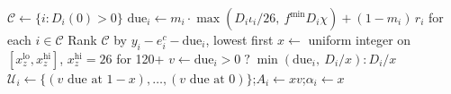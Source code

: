 \begin{algorithm}[!htbp]
\caption{Initial arrears from the \ac{CCMR} profile}
\label{alg:seed}
\begin{algorithmic}
\State $\mathcal{C} \gets \{i : D_i(0) > 0\}$ 
\State $\text{due}_i \gets m_i \cdot \max(D_i \iota_i / 26,\ f^{\min} D_i \chi) + (1 - m_i)\, r_i$ for each $i \in \mathcal{C}$
\State Rank $\mathcal{C}$ by $y_i - e^c_i - \text{due}_i$, lowest first
        \State $x \gets$ uniform integer on $[x^{\text{lo}}_z, x^{\text{hi}}_z]$, $x^{\text{hi}}_z = 26$ for 120+ 
        \State $v \gets \text{due}_i > 0 \;?\; \min(\text{due}_i,\ D_i / x) : D_i / x$
        \State $\mathcal{U}_i \gets \{(v \text{ due at } {1-x}), \ldots, (v \text{ due at } 0)\}$;\quad $A_i \gets x v$;\quad $\alpha_i \gets x$
    \EndFor
\EndFor
\end{algorithmic}
\end{algorithm}
